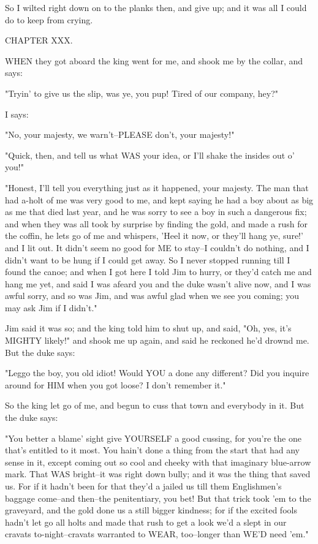 So I wilted right down on to the planks then, and give up; and it was all
I could do to keep from crying.




CHAPTER XXX.

WHEN they got aboard the king went for me, and shook me by the collar,
and says:

"Tryin' to give us the slip, was ye, you pup!  Tired of our company,
hey?"

I says:

"No, your majesty, we warn't--PLEASE don't, your majesty!"

"Quick, then, and tell us what WAS your idea, or I'll shake the insides
out o' you!"

"Honest, I'll tell you everything just as it happened, your majesty.  The
man that had a-holt of me was very good to me, and kept saying he had a
boy about as big as me that died last year, and he was sorry to see a boy
in such a dangerous fix; and when they was all took by surprise by
finding the gold, and made a rush for the coffin, he lets go of me and
whispers, 'Heel it now, or they'll hang ye, sure!' and I lit out.  It
didn't seem no good for ME to stay--I couldn't do nothing, and I didn't
want to be hung if I could get away.  So I never stopped running till I
found the canoe; and when I got here I told Jim to hurry, or they'd catch
me and hang me yet, and said I was afeard you and the duke wasn't alive
now, and I was awful sorry, and so was Jim, and was awful glad when we
see you coming; you may ask Jim if I didn't."

Jim said it was so; and the king told him to shut up, and said, "Oh, yes,
it's MIGHTY likely!" and shook me up again, and said he reckoned he'd
drownd me.  But the duke says:

"Leggo the boy, you old idiot!  Would YOU a done any different?  Did you
inquire around for HIM when you got loose?  I don't remember it."

So the king let go of me, and begun to cuss that town and everybody in
it. But the duke says:

"You better a blame' sight give YOURSELF a good cussing, for you're the
one that's entitled to it most.  You hain't done a thing from the start
that had any sense in it, except coming out so cool and cheeky with that
imaginary blue-arrow mark.  That WAS bright--it was right down bully; and
it was the thing that saved us.  For if it hadn't been for that they'd a
jailed us till them Englishmen's baggage come--and then--the
penitentiary, you bet! But that trick took 'em to the graveyard, and the
gold done us a still bigger kindness; for if the excited fools hadn't let
go all holts and made that rush to get a look we'd a slept in our cravats
to-night--cravats warranted to WEAR, too--longer than WE'D need 'em."

